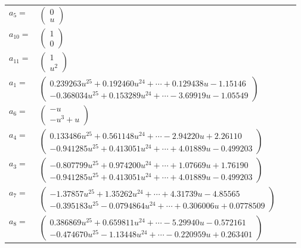 \documentclass[1p]{elsarticle_modified}
\theoremstyle{definition}
\begin{document}
\begin{tabular}{m{7pt} m{180pt} m{7pt} m{180pt} }
\flushright $a_{5}=$&$\begin{pmatrix}0\\u\end{pmatrix}$ \\
\flushright $a_{10}=$&$\begin{pmatrix}1\\0\end{pmatrix}$ \\
\flushright $a_{11}=$&$\begin{pmatrix}1\\u^2\end{pmatrix}$ \\
\flushright $a_{1}=$&$\begin{pmatrix}0.239263 u^{25}+0.192460 u^{24}+\cdots+0.129438 u-1.15146\\-0.368034 u^{25}+0.153289 u^{24}+\cdots-3.69919 u-1.05549\end{pmatrix}$ \\
\flushright $a_{6}=$&$\begin{pmatrix}- u\\- u^3+u\end{pmatrix}$ \\
\flushright $a_{4}=$&$\begin{pmatrix}0.133486 u^{25}+0.561148 u^{24}+\cdots-2.94220 u+2.26110\\-0.941285 u^{25}+0.413051 u^{24}+\cdots+4.01889 u-0.499203\end{pmatrix}$ \\
\flushright $a_{3}=$&$\begin{pmatrix}-0.807799 u^{25}+0.974200 u^{24}+\cdots+1.07669 u+1.76190\\-0.941285 u^{25}+0.413051 u^{24}+\cdots+4.01889 u-0.499203\end{pmatrix}$ \\
\flushright $a_{7}=$&$\begin{pmatrix}-1.37857 u^{25}+1.35262 u^{24}+\cdots+4.31739 u-4.85565\\-0.395183 u^{25}-0.0794864 u^{24}+\cdots+0.306006 u+0.0778509\end{pmatrix}$ \\
\flushright $a_{8}=$&$\begin{pmatrix}0.386869 u^{25}+0.659811 u^{24}+\cdots-5.29940 u-0.572161\\-0.474670 u^{25}-1.13448 u^{24}+\cdots-0.220959 u+0.263401\end{pmatrix}$ \\

\end{tabular}
\end{document}
